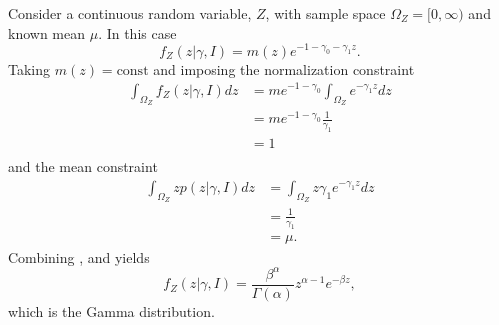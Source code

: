 \begin{example}
	Consider a continuous random variable, $Z$, with sample space $\Omega_Z = [0,\infty)$ and known mean $\mu$. In this case
	\begin{equation}
		f_Z(z|\gamma,I) = m(z) e^{-1-\gamma_0 - \gamma_1 z}.
		\label{eq:n13}
	\end{equation}
	Taking $m(z) = \text{const}$ and imposing the normalization constraint
	\begin{equation}
		\begin{split}
			\int_{\Omega_Z} f_Z(z|\gamma,I) dz &= m e^{-1-\gamma_0}\int_{\Omega_Z} e^{- \gamma_1 z} dz\\
			& = m e^{-1-\gamma_0} \frac{1}{\gamma_1}\\
			&= 1\\
		\end{split}
		\label{eq:na1}
	\end{equation}
	and the mean constraint
	\begin{equation}
		\begin{split}
			\int_{\Omega_Z} z p(z|\gamma,I) dz&= \int_{\Omega_Z} z \gamma_1 e^{-\gamma_1 z} dz\\
			& = \frac{1}{\gamma_1}\\
			&= \mu.
		\end{split}
		\label{eq:na2}
	\end{equation}
	Combining ,  and  yields
	\begin{equation}
		f_Z(z|\gamma,I) = \frac{\beta^\alpha}{\Gamma(\alpha)} z^{\alpha-1} e^{-\beta z},
	\end{equation}
	which is the Gamma distribution.
\end{example}



